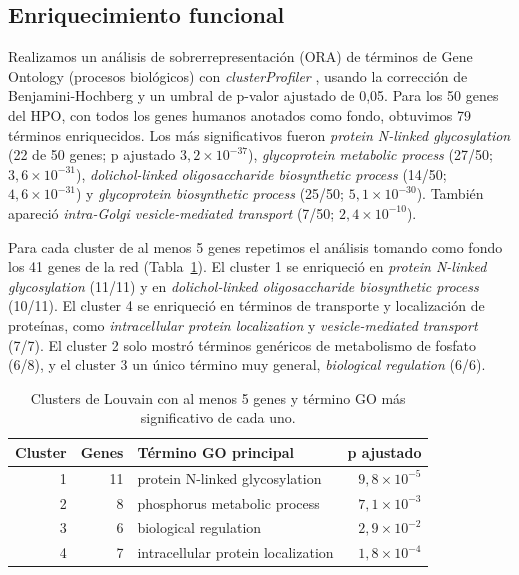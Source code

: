 \subsection{Enriquecimiento funcional}
Realizamos un análisis de sobrerrepresentación (ORA) de términos de Gene Ontology (procesos biológicos) con \textit{clusterProfiler} \cite{Yu2012}, usando la corrección de Benjamini-Hochberg \cite{BenjaminiHochberg1995} y un umbral de p-valor ajustado de 0,05. Para los 50 genes del HPO, con todos los genes humanos anotados como fondo, obtuvimos 79 términos enriquecidos. Los más significativos fueron \textit{protein N-linked glycosylation} (22 de 50 genes; p ajustado $3{,}2\times10^{-37}$), \textit{glycoprotein metabolic process} (27/50; $3{,}6\times10^{-31}$), \textit{dolichol-linked oligosaccharide biosynthetic process} (14/50; $4{,}6\times10^{-31}$) y \textit{glycoprotein biosynthetic process} (25/50; $5{,}1\times10^{-30}$). También apareció \textit{intra-Golgi vesicle-mediated transport} (7/50; $2{,}4\times10^{-10}$).

Para cada cluster de al menos 5 genes repetimos el análisis tomando como fondo los 41 genes de la red (Tabla~\ref{tab:clusters}). El cluster 1 se enriqueció en \textit{protein N-linked glycosylation} (11/11) y en \textit{dolichol-linked oligosaccharide biosynthetic process} (10/11). El cluster 4 se enriqueció en términos de transporte y localización de proteínas, como \textit{intracellular protein localization} y \textit{vesicle-mediated transport} (7/7). El cluster 2 solo mostró términos genéricos de metabolismo de fosfato (6/8), y el cluster 3 un único término muy general, \textit{biological regulation} (6/6).

\begin{table}[htbp]
	\caption{Clusters de Louvain con al menos 5 genes y término GO más significativo de cada uno.}
	\label{tab:clusters}
	\begin{tabular}{rrp{6cm}r}
		\hline
		Cluster & Genes & Término GO principal & p ajustado \\
		\hline
		1 & 11 & protein N-linked glycosylation & $9{,}8\times10^{-5}$ \\
		2 & 8 & phosphorus metabolic process & $7{,}1\times10^{-3}$ \\
		3 & 6 & biological regulation & $2{,}9\times10^{-2}$ \\
		4 & 7 & intracellular protein localization & $1{,}8\times10^{-4}$ \\
		\hline
	\end{tabular}
\end{table}

